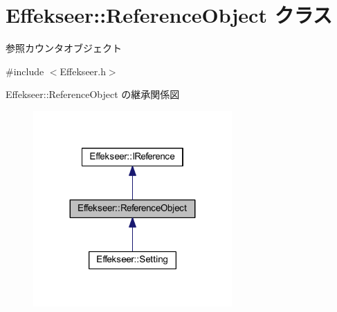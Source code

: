 \hypertarget{class_effekseer_1_1_reference_object}{}\section{Effekseer\+:\+:Reference\+Object クラス}
\label{class_effekseer_1_1_reference_object}


参照カウンタオブジェクト  




{\ttfamily \#include $<$Effekseer.\+h$>$}



Effekseer\+:\+:Reference\+Object の継承関係図\nopagebreak
\begin{figure}[H]
\begin{center}
\leavevmode
\includegraphics[width=215pt]{class_effekseer_1_1_reference_object__inherit__graph}
\end{center}
\end{figure}
